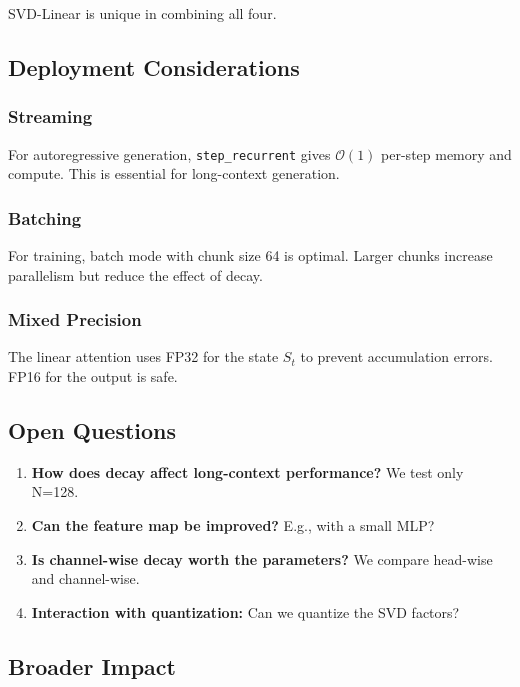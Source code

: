 SVD-Linear is unique in combining all four.

\subsection{Deployment Considerations}

\subsubsection{Streaming}

For autoregressive generation, \texttt{step\_recurrent} gives $\mathcal{O}(1)$ 
per-step memory and compute. This is essential for long-context generation.

\subsubsection{Batching}

For training, batch mode with chunk size 64 is optimal. Larger chunks 
increase parallelism but reduce the effect of decay.

\subsubsection{Mixed Precision}

The linear attention uses FP32 for the state $S_t$ to prevent accumulation 
errors. FP16 for the output is safe.

\subsection{Open Questions}

\begin{enumerate}
\item \textbf{How does decay affect long-context performance?} We test only N=128.
\item \textbf{Can the feature map be improved?} E.g., with a small MLP?
\item \textbf{Is channel-wise decay worth the parameters?} We compare head-wise
  and channel-wise.
\item \textbf{Interaction with quantization:} Can we quantize the SVD factors?

\end{enumerate}
\subsection{Broader Impact}

